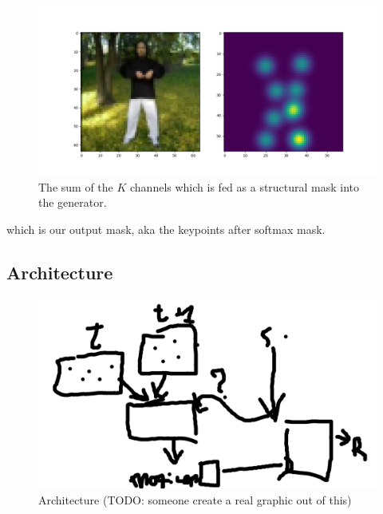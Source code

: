 \documentclass{article}
\begin{document}
\begin{figure}[ht]
\vskip 0.2in
\begin{center}
\centerline{\includegraphics[width=\columnwidth]{visualizations/softmax_sumkp}}
\caption{
The sum of the $K$ channels which is fed as a structural mask into the
generator.
}
\label{softmax-sum}
\end{center}
\vskip -0.2in
\end{figure}
which is our output mask, aka the keypoints after softmax mask.

\subsection{Architecture}
\label{method}

\begin{figure}[ht]
\vskip 0.2in
\begin{center}
\centerline{\includegraphics[width=\columnwidth]{visualizations/second_meeting_pres}}
\caption{
Architecture (TODO: someone create a real graphic out of this)
}
\label{arch}
\end{center}
\vskip -0.2in
\end{figure}
\end{document}
